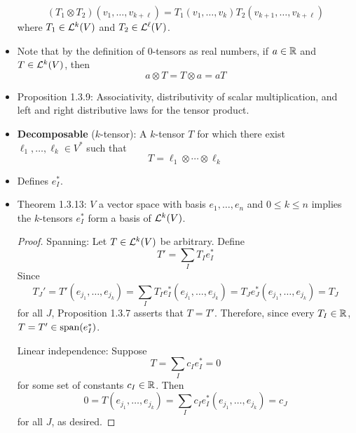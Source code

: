 \documentclass[../notes.tex]{subfiles}
\begin{document}
\begin{itemize}
    \begin{equation*}
        (T_1\otimes T_2)(v_1,\dots,v_{k+\ell}) = T_1(v_1,\dots,v_k)T_2(v_{k+1},\dots,v_{k+\ell})
    \end{equation*}
    where $T_1\in\lin[k]{V}$ and $T_2\in\lin[\ell]{V}$.
    \item Note that by the definition of 0-tensors as real numbers, if $a\in\R$ and $T\in\lin[k]{V}$, then
    \begin{equation*}
        a\otimes T = T\otimes a = aT
    \end{equation*}
    \item Proposition 1.3.9: Associativity, distributivity of scalar multiplication, and left and right distributive laws for the tensor product.
    \item \textbf{Decomposable} ($k$-tensor): A $k$-tensor $T$ for which there exist $\ell_1,\dots,\ell_k\in V^*$ such that
    \begin{equation*}
        T = \ell_1\otimes\cdots\otimes\ell_k
    \end{equation*}
    \item Defines $e_I^*$.
    \item Theorem 1.3.13: $V$ a vector space with basis $e_1,\dots,e_n$ and $0\leq k\leq n$ implies the $k$-tensors $e_I^*$ form a basis of $\lin[k]{V}$.
    \begin{proof}
        Spanning: Let $T\in\lin[k]{V}$ be arbitrary. Define
        \begin{equation*}
            T' = \sum_IT_Ie_I^*
        \end{equation*}
        Since
        \begin{equation*}
            T_J' = T'(e_{j_1},\dots,e_{j_k})
            = \sum_IT_Ie_I^*(e_{j_1},\dots,e_{j_k})
            = T_Je_J^*(e_{j_1},\dots,e_{j_k})
            = T_J
        \end{equation*}
        for all $J$, Proposition 1.3.7 asserts that $T=T'$. Therefore, since every $T_I\in\R$, $T=T'\in\spn(e_I^*)$.\par
        Linear independence: Suppose
        \begin{equation*}
            T = \sum_Ic_Ie_I^* = 0
        \end{equation*}
        for some set of constants $c_I\in\R$. Then
        \begin{equation*}
            0 = T(e_{j_1},\dots,e_{j_k})
            = \sum_Ic_Ie_I^*(e_{j_1},\dots,e_{j_k})
            = c_J
        \end{equation*}
        for all $J$, as desired.

\end{proof}
\end{itemize}
\end{document}
